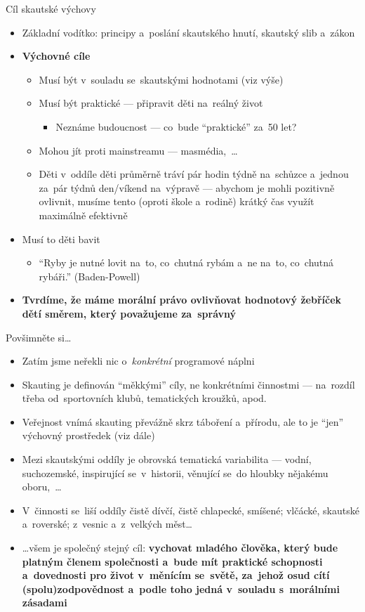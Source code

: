 \documentclass[compress, ucs, xelatex, 11pt, xcolor=dvipsnames, print,
	hyperref={
		bookmarks=true,
		unicode=true,
		colorlinks=true,
		pdftitle={Skautska vychovna metoda},
		plainpages=false,
		pdfauthor={Vojtech Zeisek},
		pdfsubject={Skautska vychovna metoda a jeji vyvoj za posledni stoleti a desetileti},
		pdfcreator={XeLaTeX},
		pdfkeywords={Junak, Pedagogika, Skaut, Skauting, Vychovna metoda},
		linkcolor=Black,
		anchorcolor=Black,
		citecolor=OliveGreen,
		filecolor=OliveGreen,
		menucolor=Black,
		urlcolor=OliveGreen,
		pdftex},
	url={hyphens, lowtilde} %
	]{beamer}
\begin{document}
\begin{frame}{Cíl skautské výchovy}
	\begin{itemize}
		\item Základní vodítko: principy a~poslání skautského hnutí, skautský slib a~zákon
		\item \textbf{Výchovné cíle}
		\begin{itemize}
			\item Musí být v~souladu se~skautskými hodnotami (viz výše)
			\item Musí být praktické --- připravit děti na~reálný život
			\begin{itemize}
		\item Neznáme budoucnost --- co~bude \enquote{praktické} za~50 let?
			\end{itemize}
			\item Mohou jít proti mainstreamu --- masmédia,~\ldots
			\item Děti v~oddíle děti průměrně tráví pár hodin týdně na~schůzce a~jednou za~pár týdnů den/víkend na~výpravě --- abychom je mohli pozitivně ovlivnit, musíme tento (oproti škole a~rodině) krátký čas využít maximálně efektivně
		\end{itemize}
		\item Musí to děti bavit
			\begin{itemize}
		\item \enquote{Ryby je nutné lovit na~to, co~chutná rybám a~ne na~to, co~chutná rybáři.} (Baden-Powell)
			\end{itemize}
		\item \textbf{Tvrdíme, že máme morální právo ovlivňovat hodnotový žebříček dětí směrem, který považujeme za~správný}
	\end{itemize}
\end{frame}

\begin{frame}{Povšimněte si\ldots}
	\begin{itemize}
		\item Zatím jsme neřekli nic o~\textit{konkrétní} programové náplni
		\item Skauting je definován \enquote{měkkými} cíly, ne konkrétními činnostmi --- na~rozdíl třeba od~sportovních klubů, tematických kroužků, apod.
		\item Veřejnost vnímá skauting převážně skrz táboření a~přírodu, ale to je \enquote{jen} výchovný prostředek (viz dále)
		\item Mezi skautskými oddíly je obrovská tematická variabilita --- vodní, suchozemské, inspirující se~v~historii, věnující se~do hloubky nějakému oboru,~\ldots
		\item V~činnosti se~liší oddíly čistě dívčí, čistě chlapecké, smíšené; vlčácké, skautské a~roverské; z~vesnic a~z~velkých měst\ldots
		\item \ldots všem je společný stejný \alert{cíl}: \textbf{vychovat mladého člověka, který bude platným členem společnosti a~bude mít praktické schopnosti a~dovednosti pro život v~měnícím se~světě, za~jehož osud cítí (spolu)zodpovědnost a~podle toho jedná v~souladu s~morálními zásadami}
	\end{itemize}
\end{frame}
\end{document}
